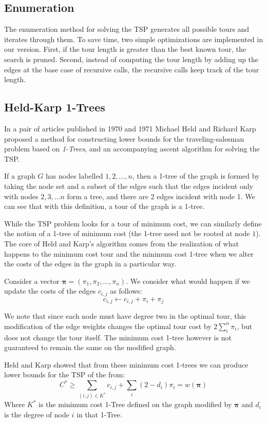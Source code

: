 \documentclass[11pt]{article}
\newcommand{\ve}[1]{\boldsymbol{#1}}
\begin{document}
	\subsection{Enumeration}
	The enumeration method for solving the TSP generates all possible tours and iterates through them. To save time, two simple optimizations are implemented in our version. First, if the tour length is greater than the best known tour, the search is pruned. Second, instead of computing the tour length by adding up the edges at the base case of recursive calls, the recursive calls keep track of the tour length. 
	
	\subsection{Held-Karp 1-Trees}
	
	In a pair of articles published in 1970 and 1971 \cite{OneTree70,OneTree71} Michael Held and Richard Karp proposed a method for constructing lower bounds for the traveling-salesman problem based on \emph{1-Trees}, and an accompanying ascent algorithm for solving the TSP.
	
	If a graph $G$ has nodes labelled $1, 2, \dots, n$, then a 1-tree of the graph is formed by taking the node set and a subset of the edges such that the edges incident only with nodes $2, 3, \dots n$ form a tree, and there are 2 edges incident with node 1. We can see that with this definition, a tour of the graph is  a 1-tree.
	
	While the TSP problem looks for a tour of minimum cost, we can similarly define the notion of a 1-tree of minimum cost (the 1-tree need not be rooted at node $1$). The core of Held and Karp's algorithm comes from the realization of what happens to the minimum cost tour and the minimum cost 1-tree when we alter the costs of the edges in the graph in a particular way.
	
	Consider a vector $\ve{\pi} = (\pi_1, \pi_2, \dots, \pi_n)$. We consider what would happen if we update the costs of the edges $c_{i,j}$ as follows:
	$$ c_{i,j} \leftarrow c_{i,j} + \pi_i + \pi_j $$
	
	We note that since each node must have degree two in the optimal tour, this modification of the edge weights changes the optimal tour cost by $2 \sum\limits_i^n \pi_i$, but does not change the tour itself. The minimum cost 1-tree however is not guaranteed to remain the same on the modified graph.
	
	Held and Karp showed that from these minimum cost 1-trees we can produce lower bounds for the TSP of the from:
	\[ C^* \geq \sum\limits_{(i,j) \in K^*} c_{i,j} + \sum\limits_i (2 - d_i)\pi_i = w(\ve{\pi}) \]
	Where $K^*$ is the minimum cost 1-Tree defined on the graph modified by $\ve{\pi}$ and $d_i$ is the degree of node $i$ in that 1-Tree. 
	
\end{document}
